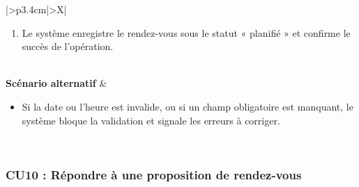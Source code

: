 \documentclass[a4paper,12pt]{report}
\begin{document}
\begin{table}[H]
\begin{tabularx}{\textwidth}{|>{\RaggedRight\arraybackslash}p{3.4cm}|>{\RaggedRight\arraybackslash}X|}
\begin{minipage}[t]{\linewidth}
\begin{enumerate}[label=\arabic*., leftmargin=*, topsep=0pt, itemsep=1pt]
    \item Le système enregistre le rendez-vous sous le statut « planifié » et confirme le succès de l'opération.
\end{enumerate}
\vspace{2pt}
\end{minipage} \\
\hline
\textbf{Scénario alternatif} &
\begin{minipage}[t]{\linewidth}\sloppy
\vspace{2pt}
\begin{itemize}[leftmargin=*, topsep=0pt, itemsep=1pt]
    \item  Si la date ou l'heure est invalide, ou si un champ obligatoire est manquant, le système bloque la validation et signale les erreurs à corriger.
\end{itemize}
\vspace{2pt}
\end{minipage} \\
\hline
\end{tabularx}
\fussy
\end{table}
\endgroup

\begingroup
\setlength{\emergencystretch}{3em}
\subsubsection*{CU10 : Répondre à une proposition de rendez-vous}
\end{document}
